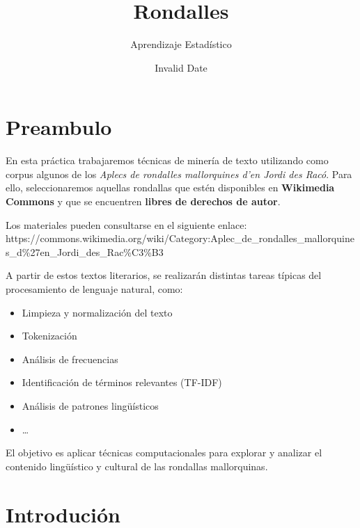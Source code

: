 \documentclass[
  letterpaper,
  DIV=11,
  numbers=noendperiod]{scrreprt}
\title{Rondalles}
\author{Aprendizaje Estadístico}
\date{Invalid Date}
\providecommand{\tightlist}{%
  \setlength{\itemsep}{0pt}\setlength{\parskip}{0pt}}
\renewcommand*\contentsname{Table of contents}
\newcommand\contentsname{Table of contents}
\begin{document}
\maketitle

\renewcommand*\contentsname{Table of contents}
{
\setcounter{tocdepth}{2}
\tableofcontents
}


\chapter*{Preambulo}\label{preambulo}


En esta práctica trabajaremos técnicas de minería de texto utilizando
como corpus algunos de los \emph{Aplecs de rondalles mallorquines d'en
Jordi des Racó}. Para ello, seleccionaremos aquellas rondallas que estén
disponibles en \textbf{Wikimedia Commons} y que se encuentren
\textbf{libres de derechos de autor}.

Los materiales pueden consultarse en el siguiente enlace:\\
https://commons.wikimedia.org/wiki/Category:Aplec\_de\_rondalles\_mallorquines\_d\%27en\_Jordi\_des\_Rac\%C3\%B3

A partir de estos textos literarios, se realizarán distintas tareas
típicas del procesamiento de lenguaje natural, como:

\begin{itemize}
\tightlist
\item
  Limpieza y normalización del texto\\
\item
  Tokenización\\
\item
  Análisis de frecuencias\\
\item
  Identificación de términos relevantes (TF-IDF)\\
\item
  Análisis de patrones lingüísticos
\item
  \ldots{}
\end{itemize}

El objetivo es aplicar técnicas computacionales para explorar y analizar
el contenido lingüístico y cultural de las rondallas mallorquinas.


\chapter{Introdución}\label{introduciuxf3n}
\end{document}
